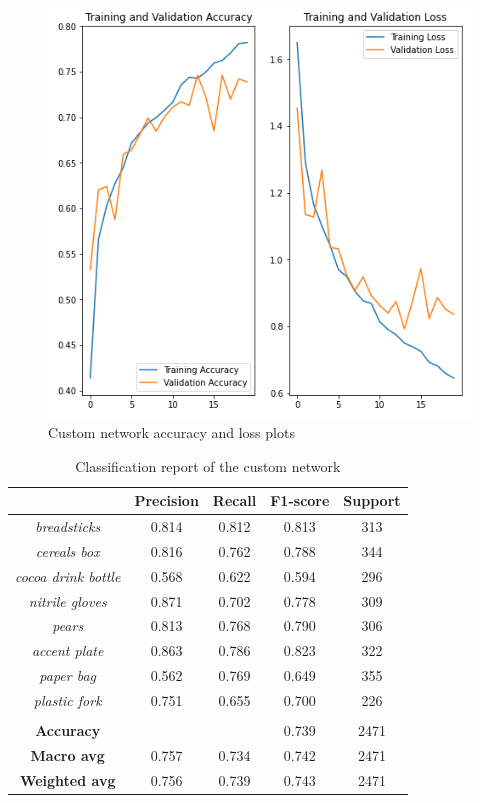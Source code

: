 \documentclass[11pt]{article}
\begin{document}
	\begin{figure}[H]
		\centering
		\includegraphics[width=.8\textwidth]{assets/custom_network_plots.png}
		\caption{Custom network accuracy and loss plots}
	\end{figure}

	\begin{table}[H]
		\centering	
		\begin{tabular}{c|c|c|c|c}
			\hline
			& \textbf{Precision} & \textbf{Recall} & \textbf{F1-score} & \textbf{Support} \\
			\hline
			\textit{breadsticks} & 0.814 & 0.812 & 0.813 & 313 \\
			\textit{cereals box} & 0.816 & 0.762 & 0.788 & 344 \\
			\textit{cocoa drink bottle} & 0.568 & 0.622 & 0.594 & 296 \\
			\textit{nitrile gloves} & 0.871 & 0.702 & 0.778 & 309 \\
			\textit{pears} & 0.813 & 0.768 & 0.790 & 306 \\
			\textit{accent plate} & 0.863 & 0.786 & 0.823 & 322 \\
			\textit{paper bag} & 0.562 & 0.769 & 0.649 & 355 \\
			\textit{plastic fork} & 0.751 & 0.655 & 0.700 & 226 \\
			\hline
			\multicolumn{5}{c}{} \\
			\hline
			\textbf{Accuracy} & & & 0.739 & 2471 \\
			\textbf{Macro avg} & 0.757 & 0.734 & 0.742 & 2471 \\
			\textbf{Weighted avg} & 0.756 & 0.739 & 0.743 & 2471 \\
			\hline
		\end{tabular}
		\caption{Classification report of the custom network}
	\end{table}
\end{document}

